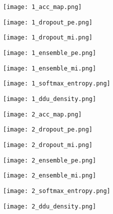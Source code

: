 \documentclass{article}
\begin{document}
\begin{figure*}[t!]
    \centering
    \begin{subfigure}{0.13\linewidth}
        \centering
        \texttt{[image: 1\_acc\_map.png]}
    \end{subfigure}
    \begin{subfigure}{0.13\linewidth}
        \centering
        \texttt{[image: 1\_dropout\_pe.png]}
    \end{subfigure}
    \begin{subfigure}{0.13\linewidth}
        \centering
        \texttt{[image: 1\_dropout\_mi.png]}
    \end{subfigure}
    \begin{subfigure}{0.13\linewidth}
        \centering
        \texttt{[image: 1\_ensemble\_pe.png]}
    \end{subfigure}
    \begin{subfigure}{0.13\linewidth}
        \centering
        \texttt{[image: 1\_ensemble\_mi.png]}
    \end{subfigure}
    \begin{subfigure}{0.13\linewidth}
        \centering
        \texttt{[image: 1\_softmax\_entropy.png]}
    \end{subfigure}
    \begin{subfigure}{0.13\linewidth}
        \centering
        \texttt{[image: 1\_ddu\_density.png]}
    \end{subfigure}

    \begin{subfigure}{0.13\linewidth}
        \centering
        \texttt{[image: 2\_acc\_map.png]}
    \end{subfigure}
    \begin{subfigure}{0.13\linewidth}
        \centering
        \texttt{[image: 2\_dropout\_pe.png]}
    \end{subfigure}
    \begin{subfigure}{0.13\linewidth}
        \centering
        \texttt{[image: 2\_dropout\_mi.png]}
    \end{subfigure}
    \begin{subfigure}{0.13\linewidth}
        \centering
        \texttt{[image: 2\_ensemble\_pe.png]}
    \end{subfigure}
    \begin{subfigure}{0.13\linewidth}
        \centering
        \texttt{[image: 2\_ensemble\_mi.png]}
    \end{subfigure}
    \begin{subfigure}{0.13\linewidth}
        \centering
        \texttt{[image: 2\_softmax\_entropy.png]}
    \end{subfigure}
    \begin{subfigure}{0.13\linewidth}
        \centering
        \texttt{[image: 2\_ddu\_density.png]}
    \end{subfigure}


\end{figure*}
\end{document}
